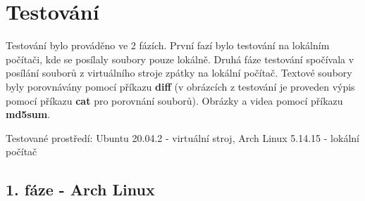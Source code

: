 \documentclass[11pt, a4paper]{article}
\begin{document}
\section{Testování}
Testování bylo prováděno ve 2 fázích. První fazí bylo testování na lokálním počítači, kde se posílaly soubory pouze lokálně. Druhá fáze testování spočívala v posílání souborů z virtuálního stroje zpátky na lokální počítač. Textové soubory byly porovnávány pomocí příkazu \textbf{diff} (v obrázcích z testování je proveden výpis pomocí příkazu \textbf{cat} pro porovnání souborů). Obrázky a videa pomocí příkazu \textbf{md5sum}.

\vspace{0.2cm}
\begin{flushleft}
Testované prostředí: Ubuntu 20.04.2 - virtuální stroj, Arch Linux 5.14.15 - lokální počítač
\end{flushleft}

\subsection{1. fáze - Arch Linux}
\end{document}
